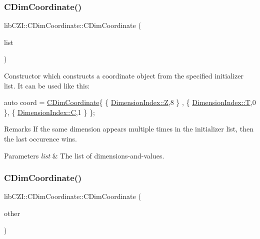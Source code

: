 \subsubsection{\texorpdfstring{C\+Dim\+Coordinate()}{CDimCoordinate()}\hspace{0.1cm}{\footnotesize\ttfamily [1/2]}}
{\footnotesize\ttfamily lib\+C\+Z\+I\+::\+C\+Dim\+Coordinate\+::\+C\+Dim\+Coordinate (\begin{DoxyParamCaption}\item[{std\+::initializer\+\_\+list$<$ \hyperlink{structlib_c_z_i_1_1_dimension_and_value}{Dimension\+And\+Value} $>$}]{list }\end{DoxyParamCaption})\hspace{0.3cm}{\ttfamily [inline]}}

Constructor which constructs a coordinate object from the specified initializer list. It can be used like this\+: 
\begin{DoxyCode}
\textcolor{keyword}{auto} coord = \hyperlink{classlib_c_z_i_1_1_c_dim_coordinate_a51d381d8965a8d10c6d0295593bc3885}{CDimCoordinate}\{ \{ \hyperlink{namespacelib_c_z_i_a55049658acf59d0eddfaebcad16df424a21c2e59531c8710156d34a3c30ac81d5}{DimensionIndex::Z},8 \} , \{ 
      \hyperlink{namespacelib_c_z_i_a55049658acf59d0eddfaebcad16df424ab9ece18c950afbfa6b0fdbfa4ff731d3}{DimensionIndex::T},0 \}, \{ \hyperlink{namespacelib_c_z_i_a55049658acf59d0eddfaebcad16df424a0d61f8370cad1d412f80b84d143e1257}{DimensionIndex::C},1 \} \};
\end{DoxyCode}
 \begin{DoxyRemark}{Remarks}
If the same dimension appears multiple times in the initializer list, then the last occurence wins. 
\end{DoxyRemark}

\begin{DoxyParams}{Parameters}
{\em list} & The list of dimensions-\/and-\/values. \\
\hline
\end{DoxyParams}
\mbox{\label{classlib_c_z_i_1_1_c_dim_coordinate_a95be8c1ca51e6bf4e5efc4f23a027148}} 
\subsubsection{\texorpdfstring{C\+Dim\+Coordinate()}{CDimCoordinate()}\hspace{0.1cm}{\footnotesize\ttfamily [2/2]}}
{\footnotesize\ttfamily lib\+C\+Z\+I\+::\+C\+Dim\+Coordinate\+::\+C\+Dim\+Coordinate (\begin{DoxyParamCaption}\item[{const \hyperlink{classlib_c_z_i_1_1_i_dim_coordinate}{lib\+C\+Z\+I\+::\+I\+Dim\+Coordinate} $\ast$}]{other }\end{DoxyParamCaption})\hspace{0.3cm}{\ttfamily [inline]}}

